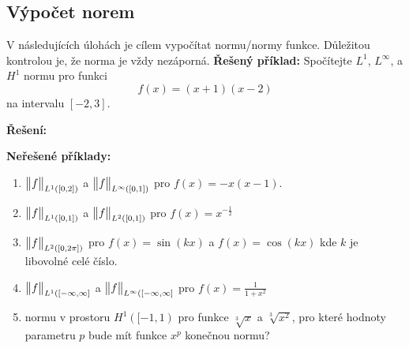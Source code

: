 \subsection{Výpočet norem}
V následujících úlohách je cílem vypočítat normu/normy funkce. Důležitou kontrolou je, že norma je vždy nezáporná.
{\bf Řešený příklad: } Spočítejte $L^1$, $L^\infty$, a $H^1$ normu pro funkci
        \[
                f(x)=(x+1)(x-2)
        \]
        na intervalu $[-2,3]$.

 {\bf Řešení: }

{\bf Neřešené příklady: }
        \begin{enumerate}
         \item $\bigl\Vert f\bigr\Vert_{L^1([0,2])}$ a $\bigl\Vert f\bigr\Vert_{L^\infty([0,1])}$ pro $f(x)=-x(x-1)$.
         \item $\bigl\Vert f\bigr\Vert_{L^1([0,1])}$ a $\bigl\Vert f\bigr\Vert_{L^2([0,1])}$ pro $f(x)=x^{-\frac12}$
         \item $\bigl\Vert f\bigr\Vert_{L^2([0,2\pi])}$ pro $f(x) =\sin(kx)$ a $f(x)=\cos(kx)$ kde $k$ je libovolné celé číslo.
           \vysl{$\sqrt{\pi}$} 
         \item $\bigl\Vert f\bigr\Vert_{L^1([-\infty,\infty]}$ a $\bigl\Vert f\bigr\Vert_{L^\infty([-\infty,\infty]}$  pro $f(x)=\frac{1}{1+x^2}$
         \item normu v prostoru $H^1([-1,1)$ pro funkce $\sqrt[3]{x}$ a $\sqrt[3]{x^2}$, pro které hodnoty parametru
                $p$ bude mít funkce $x^p$ konečnou normu?
        \end{enumerate}

